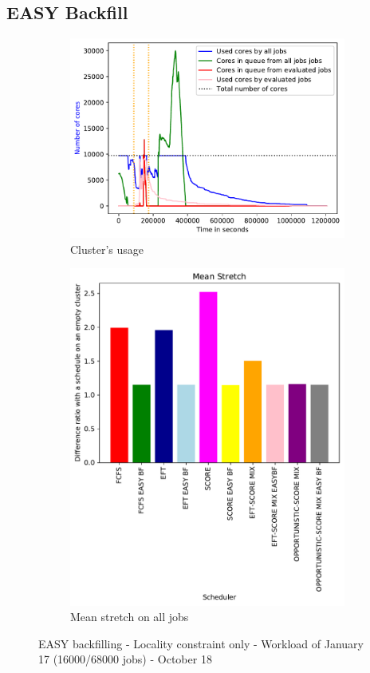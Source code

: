 \documentclass[a4paper]{article}
\begin{document}
\subsection{EASY Backfill}

\begin{figure}[H]\centering
\begin{subfigure}[b]{0.4\linewidth}\centering\includegraphics[width=1\linewidth]{MBSS/plot/2022-01-17->2022-01-17_V9271_Fcfs_Used_nodes_450_128_32_256_4_1024.pdf}\caption{Cluster's usage}\end{subfigure}
\begin{subfigure}[b]{0.4\linewidth}\centering\includegraphics[width=0.9\linewidth]{MBSS/plot/Results_FCFS_Score_Easy_Backfill_2022-01-17->2022-01-17_V9271_Mean_Stretch_450_128_32_256_4_1024.pdf}\caption{Mean stretch on all jobs}\end{subfigure}
\caption{EASY backfilling - Locality constraint only - Workload of January 17 (16000/68000 jobs) - October 18}\end{figure}
\end{document}
